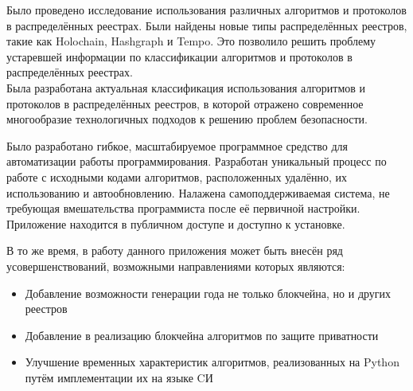 


Было проведено исследование использования различных алгоритмов и протоколов в
распределённых реестрах. Были найдены новые типы распределённых реестров, такие
как Holochain, Hashgraph и Tempo. Это позволило решить проблему устаревшей
информации по классификации алгоритмов и протоколов в распределённых реестрах.\\
Была разработана актуальная классификация использования алгоритмов и протоколов
в распределённых реестров, в которой отражено современное многообразие
технологичных подходов к решению проблем безопасности.

Было разработано гибкое, масштабируемое программное средство для автоматизации
работы программирования. Разработан уникальный процесс по работе с исходными
кодами алгоритмов, расположенных удалённо, их использованию и автообновлению.
Налажена самоподдерживаемая система, не требующая вмешательства программиста
после её первичной настройки. Приложение находится в публичном доступе и
доступно к
установке.

В то же время, в работу данного приложения может быть внесён ряд
усовершенствований, возможными направлениями которых являются:
\begin{itemize}
    \item Добавление возможности генерации года не только блокчейна, но и
          других реестров
    \item Добавление в реализацию блокчейна алгоритмов по защите приватности
    \item Улучшение временных характеристик алгоритмов, реализованных на Python
          путём имплементации их на языке CИ
\end{itemize}

